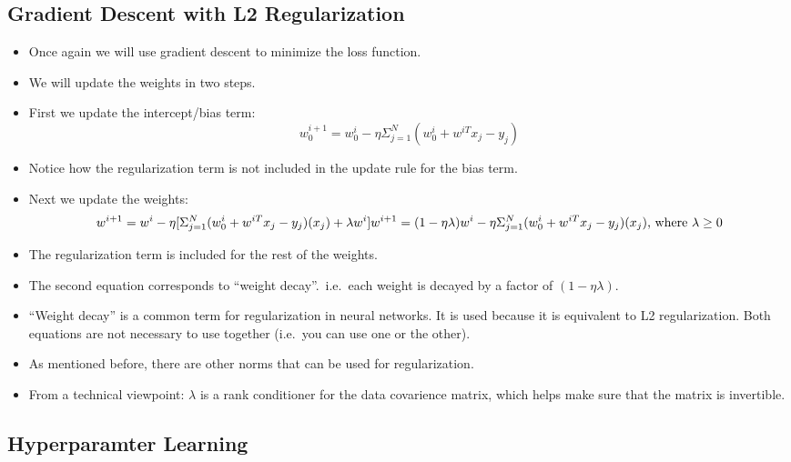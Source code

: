 \documentclass[12pt]{article}
\begin{document}
        \subsection{Gradient Descent with L2 Regularization}
            \begin{itemize}
                \item Once again we will use gradient descent to minimize the loss function.
                \item We will update the weights in two steps.
                \item First we update the intercept/bias term:
                \begin{equation}
                    w_0^{i+1} = w_0^i - \eta \Sigma_{j=1}^N (w_0^i + w^{iT}x_j-y_j)
                \end{equation}
                \item Notice how the regularization term is not included in the update rule for the bias term.
                \item Next we update the weights:
                \begin{equation}
                    w^{i+1} = w^i - \eta [ \Sigma_{j=1}^N (w_0^i + w^{iT}x_j-y_j)(x_j) + \lambda w^i ] \\
                    w^{i+1} = (1 - \eta \lambda) w^i - \eta \Sigma_{j=1}^N (w_0^i + w^{iT}x_j-y_j)(x_j) \text{, where } \lambda \geq 0
                \end{equation}
                \item The regularization term is included for the rest of the weights.
                \item The second equation corresponds to ``weight decay''.\ i.e.\ each weight is decayed by a factor of $(1 - \eta \lambda)$.
                \item ``Weight decay'' is a common term for regularization in neural networks. It is used because it is equivalent to L2 regularization. Both equations are not necessary to use together (i.e.\ you can use one or the other).
                \item As mentioned before, there are other norms that can be used for regularization.
                \item From a technical viewpoint: $\lambda$ is a rank conditioner for the data covarience matrix, which helps make sure that the matrix is invertible.
            \end{itemize}
    \subsection{Hyperparamter Learning}
\end{document}
